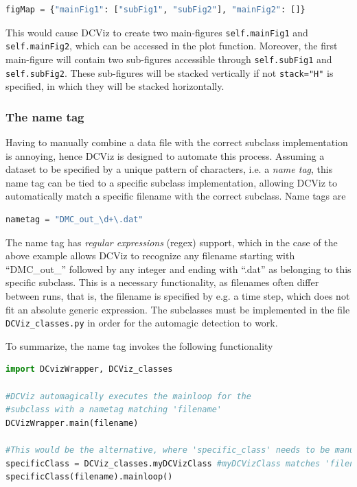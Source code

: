 \begin{lstlisting}[language=Python]
figMap = {"mainFig1": ["subFig1", "subFig2"], "mainFig2": []} 
\end{lstlisting}

This would cause DCViz to create two main-figures \verb+self.mainFig1+ and \verb+self.mainFig2+, which can be accessed in the plot function. Moreover, the first main-figure will contain two sub-figures accessible through \verb+self.subFig1+ and \verb+self.subFig2+. These sub-figures will be stacked vertically if not \verb+stack="H"+ is specified, in which they will be stacked horizontally. 


\subsubsection{The name tag}

Having to manually combine a data file with the correct subclass implementation is annoying, hence DCViz is designed to automate this process. Assuming a dataset to be specified by a unique pattern of characters, i.e. a \textit{name tag}, this name tag can be tied to a specific subclass implementation, allowing DCViz to automatically match a specific filename with the correct subclass. Name tags are

\begin{lstlisting}[language=Python]
 nametag = "DMC_out_\d+\.dat"
\end{lstlisting}

The name tag has \textit{regular expressions} (regex) support, which in the case of the above example allows DCViz to recognize any filename starting with ``DMC\_out\_'' followed by any integer and ending with ``.dat'' as belonging to this specific subclass. This is a necessary functionality, as filenames often differ between runs, that is, the filename is specified by e.g. a time step, which does not fit an absolute generic expression. The subclasses must be implemented in the file \verb+DCViz_classes.py+ in order for the automagic detection to work.

To summarize, the name tag invokes the following functionality

\begin{lstlisting}[language=Python]
import DCvizWrapper, DCViz_classes

#DCViz automagically executes the mainloop for the 
#subclass with a nametag matching 'filename'
DCVizWrapper.main(filename) 

#This would be the alternative, where 'specific_class' needs to be manually selected.
specificClass = DCViz_classes.myDCVizClass #myDCVizClass matches 'filename'
specificClass(filename).mainloop()
\end{lstlisting}


